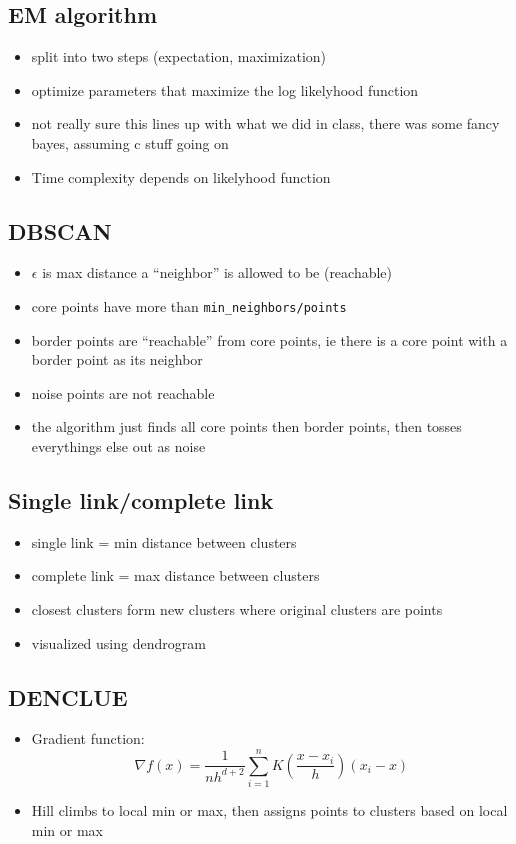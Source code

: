 \documentclass[11pt]{article}
\begin{document}
\subsection*{EM algorithm}
\label{sec:orgef1120d}
\begin{itemize}
\item split into two steps (expectation, maximization)
\item optimize parameters that maximize the log likelyhood function
\item not really sure this lines up with what we did in class, there was some fancy
bayes, assuming c stuff going on
\item Time complexity depends on likelyhood function
\end{itemize}
\subsection*{DBSCAN}
\label{sec:org9cabdf9}
\begin{itemize}
\item \(\epsilon\) is max distance a ``neighbor'' is allowed to be (reachable)
\item core points have more than \texttt{min\_neighbors/points}
\item border points are ``reachable'' from core points, ie there is a core point with
a border point as its neighbor
\item noise points are not reachable
\item the algorithm just finds all core points then border points, then tosses
everythings else out as noise
\end{itemize}
\subsection*{Single link/complete link}
\label{sec:org600bebe}
\begin{itemize}
\item single link = min distance between clusters
\item complete link = max distance between clusters
\item closest clusters form new clusters where original clusters are points
\item visualized using dendrogram
\end{itemize}
\subsection*{DENCLUE}
\label{sec:org567a27f}
\begin{itemize}
\item Gradient function: \[\nabla f(x) = \frac{1}{nh^{d+2}}\sum \limits^n_{i=1}K\left(\frac{x-x_i}{h}\right)(x_i-x)\]
\item Hill climbs to local min or max, then assigns points to clusters based on
local min or max
\end{itemize}
\end{document}

